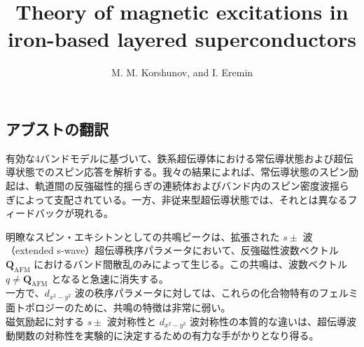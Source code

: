 \documentclass[a4paper,12pt]{article}
\title{Theory of magnetic excitations in iron-based layered superconductors}
\author{M. M. Korshunov, and I. Eremin}
\date{}
\begin{document}
\begin{CJK}{UTF8}{min}
\maketitle

\section*{アブストの翻訳}
有効な4バンドモデルに基づいて、鉄系超伝導体における常伝導状態および超伝導状態でのスピン応答を解析する。我々の結果によれば、常伝導状態のスピン励起は、軌道間の反強磁性的揺らぎの連続体およびバンド内のスピン密度波揺らぎによって支配されている。一方、非従来型超伝導状態では、それとは異なるフィードバックが現れる。

明瞭なスピン・エキシトンとしての共鳴ピークは、拡張された \( s\pm \) 波（extended s-wave）超伝導秩序パラメータにおいて、反強磁性波数ベクトル \(\mathbf{Q}_{\mathrm{AFM}}\) におけるバンド間散乱のみによって生じる。この共鳴は、波数ベクトル \( q \neq \mathbf{Q}_{\mathrm{AFM}} \) となると急速に消失する。\\
一方で、\( d_{x^2-y^2} \) 波の秩序パラメータに対しては、これらの化合物特有のフェルミ面トポロジーのために、共鳴の特徴は非常に弱い。\\
磁気励起に対する \( s\pm \) 波対称性と \( d_{x^2-y^2} \) 波対称性の本質的な違いは、超伝導波動関数の対称性を実験的に決定するための有力な手がかりとなり得る。


\end{CJK}
\end{document}
